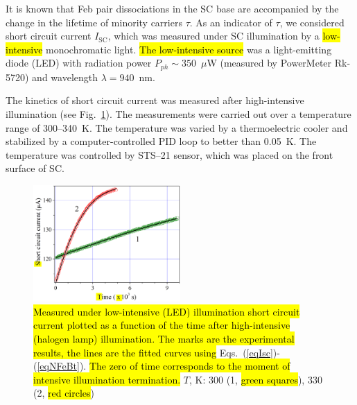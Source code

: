 \documentclass[sn-mathphys]{sn-jnl}%
\theoremstyle{thmstyleone}%
\theoremstyle{thmstyletwo}%
\theoremstyle{thmstylethree}%
\begin{document}

It is known that Feb pair dissociations in the SC base are accompanied by the change
in the lifetime of minority carriers $\tau$.
As an indicator of $\tau$, we considered short circuit current $I_\mathrm{SC}$,
which was measured under SC illumination by a \hl{low-intensive} monochromatic light.
\hl{The low-intensive source} was a light-emitting diode (LED) with radiation
power $P_{ph}\sim350$~$\mu$W (measured by PowerMeter Rk-5720) and
wavelength $\lambda=940$~nm.


The kinetics of short circuit current was measured after high-intensive illumination
(see Fig.~\ref{figIsc}).
The measurements were carried out over a temperature range
of 300--340~K.
The temperature was varied by a thermoelectric cooler and stabilized by a
computer-controlled PID loop to better than 0.05~K.
The temperature was controlled by STS--21 sensor, which was placed on the front surface of SC.

\begin{figure}
\centering
\includegraphics[width=0.5\textwidth]{Fig2}
\caption{
\hl{Measured under low-intensive (LED) illumination short circuit current
 plotted as a function of the time after high-intensive (halogen lamp) illumination.
The marks are the experimental results, the lines are the fitted curves using} Eqs.~(\ref{eqIsc})-(\ref{eqNFeBt}).
\hl{The zero of time corresponds to the moment of intensive illumination termination.}
$T$, K: 300 (1, \hl{ green squares}), 330 (2, \hl{red circles})}
\label{figIsc}       %
\end{figure}
\end{document}
